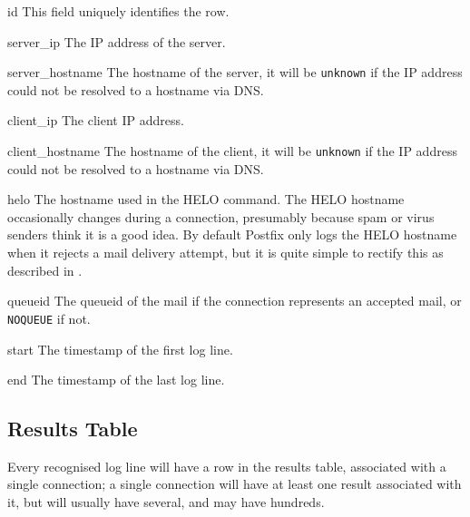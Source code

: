 \begin{boldeqlist}

    \item [id] This field uniquely identifies the row.

    \item [server\_ip] The IP address of the server.

    \item [server\_hostname] The hostname of the server, it will be
        \texttt{unknown} if the IP address could not be resolved to a
        hostname via DNS\@.

    \item [client\_ip] The client IP address.

    \item [client\_hostname] The hostname of the client, it will be
        \texttt{unknown} if the IP address could not be resolved to a
        hostname via DNS\@.

    \item [helo] The hostname used in the HELO command.  The HELO hostname
        occasionally changes during a connection, presumably because spam
        or virus senders think it is a good idea.  By default Postfix only
        logs the HELO hostname when it rejects a mail delivery attempt, but
        it is quite simple to rectify this as described in
        .

    \item [queueid] The queueid of the mail if the connection represents an
        accepted mail, or \texttt{NOQUEUE} if not.

    \item [start] The timestamp of the first log line.

    \item [end] The timestamp of the last log line.

\end{boldeqlist}

\subsection{Results Table}

\label{results table}

Every recognised log line will have a row in the results table, associated
with a single connection; a single connection will have at least one result
associated with it, but will usually have several, and may have hundreds.

